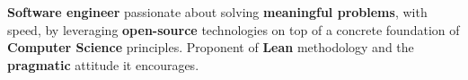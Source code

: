 
\begin{cvparagraph}
  \textbf{Software engineer} passionate about solving \textbf{meaningful problems}, with speed, by leveraging \textbf{open-source} technologies on top of a concrete foundation of \textbf{Computer Science} principles. Proponent of \textbf{Lean} methodology and the \textbf{pragmatic} attitude it encourages.
\end{cvparagraph}
